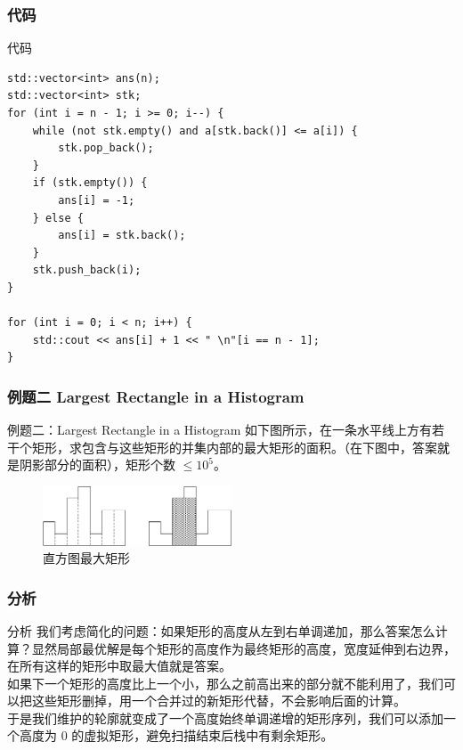 \documentclass{beamer}
\begin{document}
\subsubsection{代码}
\begin{frame}[fragile]{代码}
    \begin{verbatim}
std::vector<int> ans(n);
std::vector<int> stk;
for (int i = n - 1; i >= 0; i--) {
    while (not stk.empty() and a[stk.back()] <= a[i]) {
        stk.pop_back();
    }
    if (stk.empty()) {
        ans[i] = -1;
    } else {
        ans[i] = stk.back();
    }
    stk.push_back(i);
}

for (int i = 0; i < n; i++) {
    std::cout << ans[i] + 1 << " \n"[i == n - 1];
}
    \end{verbatim}
\end{frame}

\subsubsection{例题二 Largest Rectangle in a Histogram}
\begin{frame}{例题二：Largest Rectangle in a Histogram}
    如下图所示，在一条水平线上方有若干个矩形，求包含与这些矩形的并集内部的最大矩形的面积。（在下图中，答案就是阴影部分的面积），矩形个数 $\le 10^5$。

    \begin{figure}
        \begin{center}
            \includegraphics[width=0.5\textwidth]{./pic/rectangle.png}
            \caption{直方图最大矩形}
        \end{center}
    \end{figure}
\end{frame}

\subsubsection{分析}
\begin{frame}{分析}
    我们考虑简化的问题：如果矩形的高度从左到右单调递加，那么答案怎么计算？显然局部最优解是每个矩形的高度作为最终矩形的高度，宽度延伸到右边界，在所有这样的矩形中取最大值就是答案。\\

    如果下一个矩形的高度比上一个小，那么之前高出来的部分就不能利用了，我们可以把这些矩形删掉，用一个合并过的新矩形代替，不会影响后面的计算。\\

    于是我们维护的轮廓就变成了一个高度始终单调递增的矩形序列，我们可以添加一个高度为 $0$ 的虚拟矩形，避免扫描结束后栈中有剩余矩形。
\end{frame}
\end{document}
